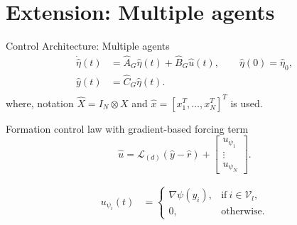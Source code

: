 \documentclass{beamer}
\begin{document}
\section{Extension: Multiple agents}
\begin{frame}{Control Architecture: Multiple agents}
	\begin{equation*} %
		\begin{split}
			\Dot{\hat{\eta}}(t)&=\hat{A}_G\hat{\eta}(t) + \hat{B}_G \hat{u}(t), \quad \quad \hat{\eta}(0)=\hat{\eta}_{0},\\
			\hat{y}(t)&=\hat{C}_G \hat{\eta}(t). \\
		\end{split}
	\end{equation*}
where, notation $\hat{X}=I_N \otimes X$ and $\hat{x}=[x_1^T,\hdots,x_N^T]^T$ is used.
\pause
\begin{block}{Formation control law with gradient-based forcing term}
\begin{equation}\label{eq:control_law}
	\hat{u}=\mathcal{L}_{(d)}(\hat{y}-\hat{r})+\begin{bmatrix}u_{\psi_1}\\ \vdots \\u_{\psi_N}\end{bmatrix}.
\end{equation}

\begin{equation}\label{eq:forcing_term}
	\begin{split}
		u_{\psi_i}(t)&=
		\begin{cases}
			\nabla \psi(y_i), & \text{if}\ i\in \mathcal{V}_l, \\
			0, & \text{otherwise}.
		\end{cases}
	\end{split}
\end{equation}
\end{block}
\end{frame}
\end{document}
